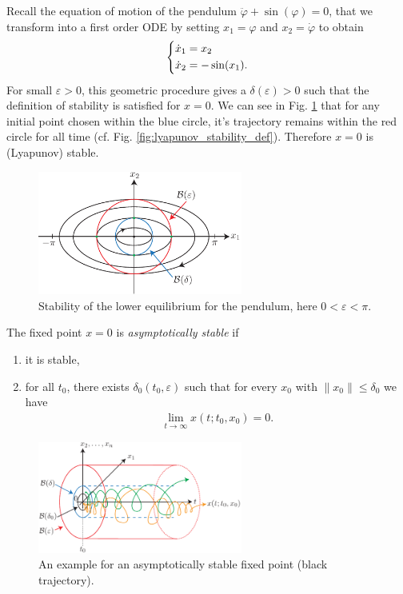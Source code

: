 \begin{ex}
	Recall the equation of motion of the pendulum $\ddot{\varphi} + \sin(\varphi) = 0$, that we transform into a first order ODE by setting $x_1 = \varphi$ and $x_2 = \dot{\varphi}$ to obtain
	\begin{align}
		\begin{dcases}
		\dot{x}_1 = x_2 \\
	\dot{x}_2 = -\sin(x_1).
		\end{dcases}
	\end{align}
	For small $\varepsilon>0$, this geometric procedure gives a $\delta(\varepsilon)>0$ such that the definition of stability is satisfied for $ {x}=0$. We can see in Fig. \ref{fig:pend_lower_stability} that for any initial point chosen within the blue circle, it's trajectory remains within the red circle for all time (cf. Fig. \ref{fig:lyapunov_stability_def}). Therefore $ {x}=0$ is (Lyapunov) stable.
	\begin{figure}[h!]
		\centering
		\includegraphics[width=0.6\textwidth]{figures/ch2/2pendulum_stability.pdf}
		\caption{Stability of the lower equilibrium for the pendulum, here $0<\varepsilon<\pi $.}
	\label{fig:pend_lower_stability}
	\end{figure}
\end{ex}

\begin{definition}
	The fixed point $ {x}=0$ is \emph{asymptotically stable} if
\begin{enumerate}
	\item it is stable,
	\item for all $t_0$, there exists $\delta_0(t_0, \varepsilon)$ such that for every $ {x}_0$ with $\|  {x}_0 \| \leq \delta_0$ we have
		\begin{align}
			\boxed{\lim_{t\to \infty }  {x}(t; t_0,  {x}_0) = 0.}
		\end{align}
\end{enumerate}
\begin{figure}[h!]
	\centering
	\includegraphics[width=0.6\textwidth]{figures/ch2/3asymp_stability.pdf}
	\caption{An example for an asymptotically stable fixed point (black trajectory).}
\end{figure}
\end{definition}

